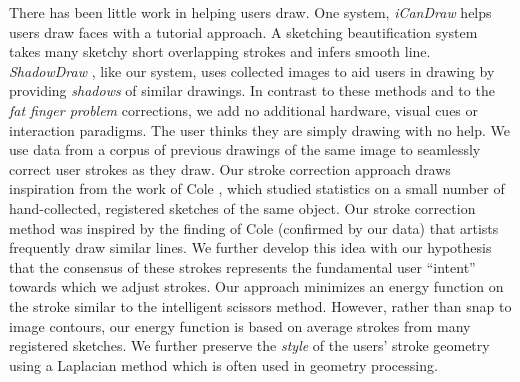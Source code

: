 There has been little work in helping users draw. One system, \emph{iCanDraw}\cite{Dixon:2010:IUS} helps users draw faces with a tutorial approach. A sketching beautification system~\cite{Orbay2011} takes many sketchy short overlapping strokes and infers smooth line. \emph{ShadowDraw} \cite{Lee:2011}, like our system, uses collected images to aid users in drawing by providing {\em shadows} of similar drawings.  In contrast to these methods and to the \emph{fat finger problem} corrections, we add no additional hardware, visual cues or interaction paradigms. The user thinks they are simply drawing with no help. We use data from a corpus of previous drawings of the same image to seamlessly correct user strokes as they draw. Our stroke correction approach draws inspiration from the work of Cole \etal {}, which studied statistics on a small number of hand-collected, registered sketches of the same object. Our stroke correction method was inspired by the finding of Cole \etal (confirmed by our data) that artists frequently draw similar lines. We further develop this idea with our hypothesis that the consensus of these strokes represents the fundamental user ``intent'' towards which we adjust strokes. Our approach minimizes an energy function on the stroke similar to the intelligent scissors method\cite{Mortensen:1995:ISF}. However, rather than snap to image contours, our energy function is based on average strokes from many registered sketches. We further preserve the {\em style} of the users' stroke geometry using a Laplacian method which is often used in geometry processing\cite{Sorkine:2004:LSE}.

